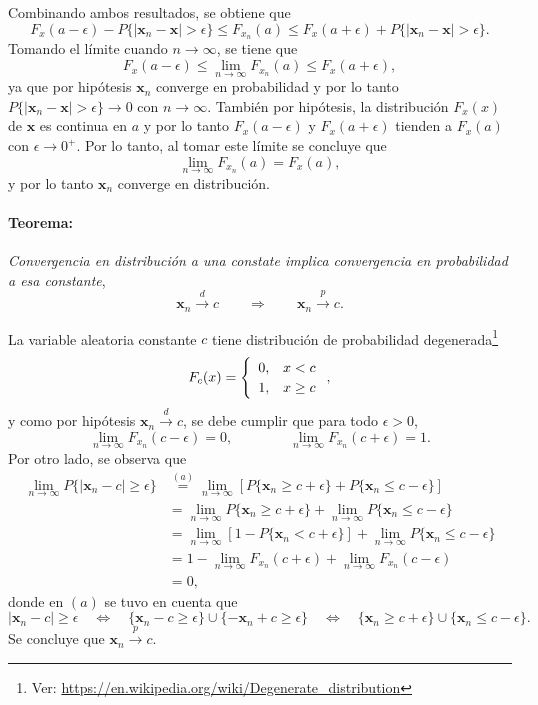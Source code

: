 \documentclass[a4paper]{report}
\newcommand{\x}{\mathbf{x}}
\begin{document}
Combinando ambos resultados, se obtiene que
\[
 F_x(a-\epsilon)-P\{|\x_n-\x|>\epsilon\}\leq F_{x_n}(a)\leq F_x(a+\epsilon)+P\{|\x_n-\x|>\epsilon\}.
\]
Tomando el límite cuando \(n\to\infty\), se tiene que
\[
 F_x(a-\epsilon)\leq \lim_{n\to\infty} F_{x_n}(a)\leq F_x(a+\epsilon),
\]
ya que por hipótesis \(\x_n\) converge en probabilidad y por lo tanto \(P\{|\x_n-\x|>\epsilon\}\to 0\) con \(n\to\infty\). También por hipótesis, la distribución \(F_x(x)\) de \(\x\) es continua en \(a\) y por lo tanto \(F_x(a-\epsilon)\) y \(F_x(a+\epsilon)\) tienden a \(F_x(a)\) con \(\epsilon\to0^{+}\). Por lo tanto, al tomar este límite se concluye que
\[
 \lim_{n\to\infty} F_{x_n}(a) = F_x(a),
\]
y por lo tanto \(\x_n\) converge en distribución.

\paragraph{Teorema:} \emph{Convergencia en distribución a una constate implica convergencia en probabilidad a esa constante},
\[
 \x_n\overset{d}{\longrightarrow}c\qquad\Rightarrow\qquad\x_n\overset{p}{\longrightarrow}c.
\]

La variable aleatoria constante \(c\) tiene distribución de probabilidad degenerada\footnote{Ver: \url{https://en.wikipedia.org/wiki/Degenerate_distribution}}
\[\def\arraystretch{1.2}
 F_c(x)=
 \left\{\begin{array}{ll}
  0, &  x<c\\
  1, &  x\geq c
 \end{array}\right.,
\]
y como por hipótesis \(\x_n\overset{d}{\longrightarrow}c\), se debe cumplir que para todo \(\epsilon>0\),
\[
 \lim_{n\to\infty}F_{x_n}(c-\epsilon)=0,\qquad\qquad
 \lim_{n\to\infty}F_{x_n}(c+\epsilon)=1.
\]
Por otro lado, se observa que
\begin{align*}
 \lim_{n\to\infty}P\{|\x_n-c|\geq\epsilon\}&\overset{(a)}{=}\lim_{n\to\infty}\left[P\{\x_n\geq c+\epsilon\}+P\{\x_n\leq c-\epsilon\}\right]\\
 &=\lim_{n\to\infty}P\{\x_n\geq c+\epsilon\}+\lim_{n\to\infty}P\{\x_n\leq c-\epsilon\}\\
 &=\lim_{n\to\infty}\left[1-P\{\x_n< c+\epsilon\}\right]+\lim_{n\to\infty}P\{\x_n\leq c-\epsilon\}\\
 &=1-\lim_{n\to\infty}F_{x_n}(c+\epsilon)+\lim_{n\to\infty}F_{x_n}(c-\epsilon)\\
 &=0,
\end{align*}
donde en \((a)\) se tuvo en cuenta que
\[
 |\x_n-c|\geq\epsilon\quad\Leftrightarrow\quad\{\x_n-c\geq\epsilon\}\cup\{-\x_n+c\geq\epsilon\}
 \quad\Leftrightarrow\quad\{\x_n\geq c+\epsilon\}\cup\{\x_n\leq c-\epsilon\}.
\]
Se concluye que \(\x_n\overset{p}{\longrightarrow}c\).
\end{document}
